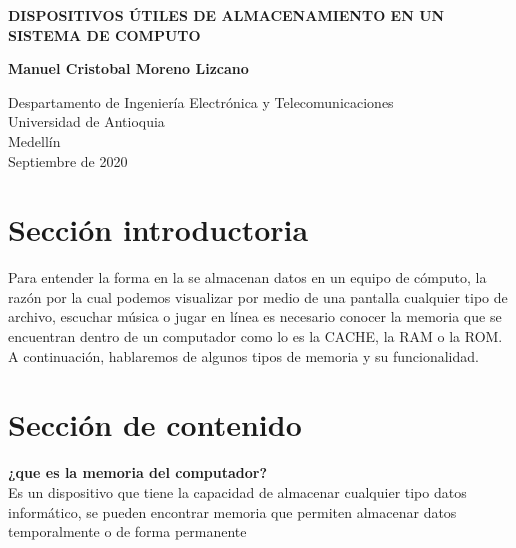 \documentclass{article}
\begin{document}
\begin{titlepage}
    \begin{center}
        \vspace*{1cm}
            
        \Huge
        \textbf{DISPOSITIVOS ÚTILES DE ALMACENAMIENTO EN UN SISTEMA DE COMPUTO}
            
        \vspace{0.5cm}
        \LARGE
            
        \vspace{1.5cm}
            
        \textbf{Manuel Cristobal Moreno Lizcano}
            
        \vfill
            
        \vspace{0.8cm}
            
        \Large
        Despartamento de Ingeniería Electrónica y Telecomunicaciones\\
        Universidad de Antioquia\\
        Medellín\\
        Septiembre de 2020
            
    \end{center}
\end{titlepage}

\tableofcontents

\section{Sección introductoria}

Para entender la forma en la se almacenan datos en un equipo de cómputo, la razón por la cual podemos visualizar por medio de una pantalla cualquier tipo de archivo, escuchar música o jugar en línea es necesario conocer la memoria que se encuentran dentro de un computador como lo es la CACHE, la RAM o la ROM. A continuación, hablaremos de algunos tipos de memoria y su funcionalidad. 

\section{Sección de contenido} \label{contenido}
\textbf{¿que es la memoria del computador?}
\\[2ex]
Es un dispositivo que tiene la capacidad de almacenar cualquier tipo datos informático, se pueden encontrar memoria que permiten almacenar datos temporalmente o de forma permanente
\\[2ex]
\end{document}

